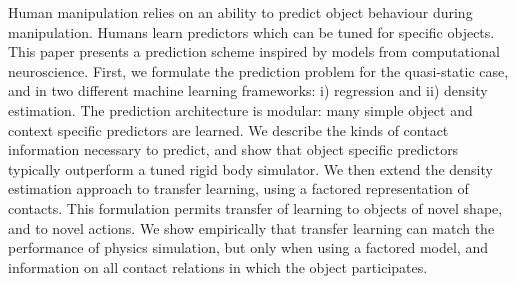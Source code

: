 Human manipulation relies on an ability to predict object behaviour during manipulation. Humans learn predictors which can be tuned for specific objects. This paper presents a prediction scheme inspired by models from computational neuroscience. First, we formulate the prediction problem for the quasi-static case, and in two different machine learning frameworks: i) regression and ii) density estimation. The prediction architecture is modular: many simple object and context specific predictors are learned. We describe the kinds of contact information necessary to predict, and show that object specific predictors typically outperform a tuned rigid body simulator. We then extend the density estimation approach to transfer learning, using a factored representation of contacts. This formulation permits transfer of learning to objects of novel shape, and to novel actions. We show empirically that transfer learning can match the performance of physics simulation, but only when using a factored model, and information on all contact relations in which the object participates.